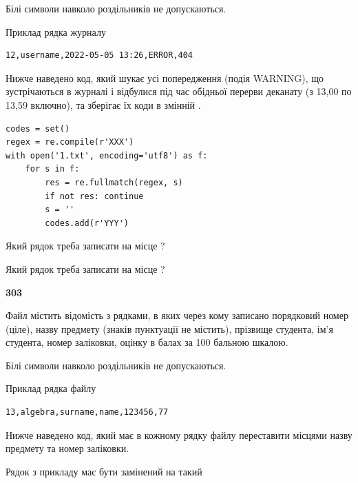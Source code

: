 Білі символи навколо роздільників не допускаються.

Приклад рядка журналу



\begin{verbatim}
12,username,2022-05-05 13:26,ERROR,404
\end{verbatim}


Нижче наведено код, який шукає усі попередження (подія WARNING), що зустрі\-ча\-ються в журналі і відбулися під час обідньої перерви деканату (з 13,00 по 13,59 включно), та зберігає їх коди в змінній .



\begin{verbatim}
codes = set()
regex = re.compile(r'XXX')
with open('1.txt', encoding='utf8') as f:
    for s in f:
        res = re.fullmatch(regex, s)
        if not res: continue
        s = ''
        codes.add(r'YYY')
\end{verbatim}







Який рядок треба записати на місце  ?\par
\vspace{5mm}


Який рядок треба записати на місце  ?\par


\newpage

{\begin {center}\textbf{ 303}\end {center}}\par
Файл  містить відомість з рядками, в яких через кому записано поряд\-ковий номер (ціле), назву предмету (знаків пунктуації не містить), прізвище студента, ім'я студента, номер заліковки, оцінку в балах за 100 бальною шкалою.

Білі символи навколо роздільників не допускаються.

Приклад рядка файлу



\begin{verbatim}
13,algebra,surname,name,123456,77
\end{verbatim}


Нижче наведено код, який має в кожному рядку файлу переставити місцями назву предмету та номер заліковки.

Рядок з прикладу має бути замінений на такий



